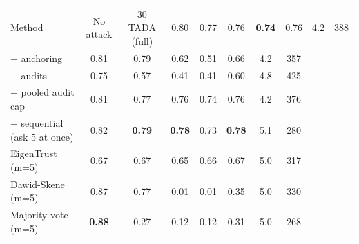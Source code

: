\begin{tabular}{lccccccc}
\toprule
Method & No attack & 30%
\midrule
TADA (full) & 0.80 & 0.77 & 0.76 & \textbf{0.74} & 0.76 & 4.2 & 388\\
\quad $-$ anchoring & 0.81 & 0.79 & 0.62 & 0.51 & 0.66 & 4.2 & 357\\
\quad $-$ audits & 0.75 & 0.57 & 0.41 & 0.41 & 0.60 & 4.8 & 425\\
\quad $-$ pooled audit cap & 0.81 & 0.77 & 0.76 & 0.74 & 0.76 & 4.2 & 376\\
\quad $-$ sequential (ask 5 at once) & 0.82 & \textbf{0.79} & \textbf{0.78} & 0.73 & \textbf{0.78} & 5.1 & 280\\
\midrule
EigenTrust (m=5) & 0.67 & 0.67 & 0.65 & 0.66 & 0.67 & 5.0 & 317\\
Dawid-Skene (m=5) & 0.87 & 0.77 & 0.01 & 0.01 & 0.35 & 5.0 & 330\\
Majority vote (m=5) & \textbf{0.88} & 0.27 & 0.12 & 0.12 & 0.31 & 5.0 & 268\\
\bottomrule
\end{tabular}
